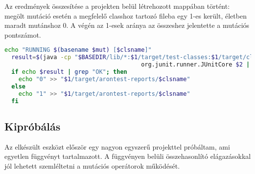 Az eredmények összesítése a projekten belül létrehozott mappában történt: megölt mutáció esetén a megfelelő classhoz tartozó fileba egy 1-es került, életben maradt mutánshoz 0. A végén az 1-esek aránya az összeshez jelentette a mutációs pontszámot.
\begin{lstlisting}[frame=single,float=!ht,caption={Részlet a shell scriptből},captionpos=b,label={lst:tool_shell_junit},language=bash]
  echo "RUNNING $(basename $mut) [$clsname]"
  result=$(java -cp "$BASEDIR/lib/*:$1/target/test-classes:$1/target/classes" \
                                       org.junit.runner.JUnitCore $2 | grep "Tests run\|OK")
  if echo $result | grep "OK"; then
    echo "0" >> "$1/target/arontest-reports/$clsname"
  else
    echo "1" >> "$1/target/arontest-reports/$clsname"
  fi
\end{lstlisting}

\subsection{Kipróbálás}
Az elkészült eszközt először egy nagyon egyszerű projekttel próbáltam, ami egyetlen függvényt tartalmazott. A függvényen belüli összehasonlító elágazásokkal jól lehetett szemléltetni a mutációs operátorok működését. 

